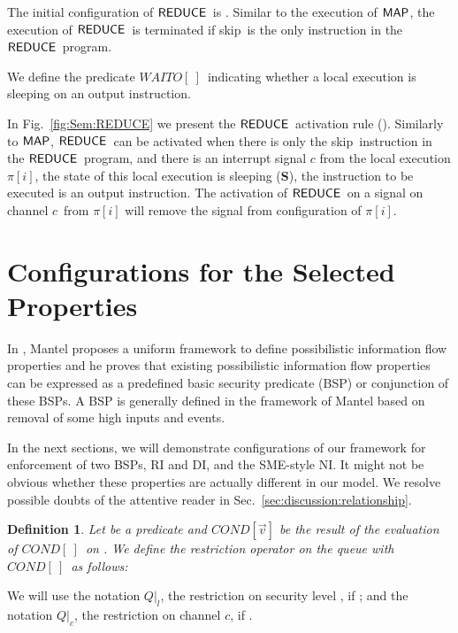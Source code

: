 \documentclass[10pt,a4paper,oneside]{article}
\newtheorem{definition}{Definition}[section]
\def\restrict#1#2{\ensuremath{{#1}|_{#2}}}
\def\intsig#1{\ensuremath{#1}}
\def\sS{\textbf{S}}
\def\chnl{\ensuremath{c}}
\def\sanserif#1{\ensuremath{\sf #1}}
\def\REDUCE{\ensuremath{\sanserif{REDUCE}}}
\def\MAP{\ensuremath{\sanserif{MAP}}}
\def\Prog{\ensuremath{\pi}}
\def\Progl#1{\ensuremath{\Prog[#1]}}
\def\NSKIP{skip}
\def\NINIREDUCE{\ensuremath{WAITO}}
\def\emptyPlace{\ensuremath{[\ ]}}
\def\INIREDUCED{\ensuremath{\NINIREDUCE\emptyPlace}}
\def\COND{\ensuremath{COND[\ ]}}
\def\CONDP#1{\ensuremath{COND[#1]}}
\begin{document}
The initial configuration of \REDUCE\ is . Similar to the execution of \MAP, the execution of \REDUCE\ is terminated if \NSKIP\ is the only instruction in the \REDUCE\ program.




We define the predicate \INIREDUCED\ indicating whether a local execution is sleeping on an output instruction.





In Fig.~\ref{fig:Sem:REDUCE} we present the \REDUCE\ activation rule ().  Similarly to \MAP, \REDUCE\ can be activated when there is only the \NSKIP\ instruction in the \REDUCE\ program, and there is an interrupt signal  \intsig{\chnl} from the local execution \Progl{i}, the state of this local execution is sleeping (\sS), the instruction to be executed is an output instruction. The activation of  \REDUCE\ on a signal on channel \chnl\ from \Progl{i} will remove the signal from configuration of \Progl{i}.

\section{Configurations for the Selected Properties}\label{sec:em}

In \cite{MANT-00-CSF}, Mantel proposes a uniform framework to define possibilistic information flow properties and he proves that existing possibilistic information flow properties can be expressed as a predefined basic security predicate (BSP) or conjunction of these BSPs. A BSP is generally defined in the framework of Mantel based on removal of some high inputs and events.





In the next sections, we will demonstrate configurations of our framework for enforcement of two BSPs, RI and DI, and the SME-style NI. It might not be obvious whether these properties are actually different in our model. We resolve possible doubts of the attentive reader in Sec.~\ref{sec:discussion:relationship}.

\begin{definition}
Let  be a predicate and \CONDP{\vec{v}} be the result of the evaluation of \COND\ on . We define the restriction operator on the queue  with \COND\ as follows:

\end{definition}

We will use the notation \restrict{Q}{l}, the restriction on security level , if ; and the notation \restrict{Q}{\chnl}, the restriction on channel \chnl, if .
\end{document}
